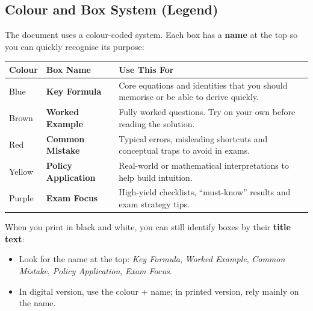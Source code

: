 \documentclass[12pt]{article}
\begin{document}
\subsection*{Colour and Box System (Legend)}
The document uses a colour-coded system. Each box has a \textbf{name} at the top so you can quickly recognise its purpose:
\begin{center}
\begin{tabular}{|l|l|p{7cm}|}
\hline
\textbf{Colour} & \textbf{Box Name} & \textbf{Use This For} \\
\hline
\colorbox{blue!5}{Blue} & \textbf{Key Formula} & Core equations and identities that you should memorise or be able to derive quickly. \\
\hline
\colorbox{brown!5}{Brown} & \textbf{Worked Example} & Fully worked questions. Try on your own before reading the solution. \\
\hline
\colorbox{red!5}{Red} & \textbf{Common Mistake} & Typical errors, misleading shortcuts and conceptual traps to avoid in exams. \\
\hline
\colorbox{yellow!10}{Yellow} & \textbf{Policy Application} & Real-world or mathematical interpretations to help build intuition. \\
\hline
\colorbox{purple!5}{Purple} & \textbf{Exam Focus} & High-yield checklists, ``must-know'' results and exam strategy tips. \\
\hline
\end{tabular}
\end{center}

\noindent
When you print in black and white, you can still identify boxes by their \textbf{title text}:
\begin{itemize}
\item Look for the name at the top: \textit{Key Formula}, \textit{Worked Example}, \textit{Common Mistake}, \textit{Policy Application}, \textit{Exam Focus}.
\item In digital version, use the colour + name; in printed version, rely mainly on the name.
\end{itemize}

\newpage

\end{document}

